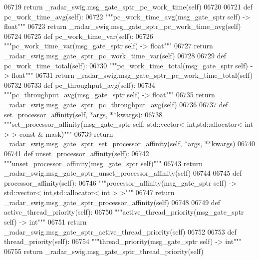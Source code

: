 \begin{DoxyCode}
{{{{{{{{{{{{{{{{{{{{{{06719         \textcolor{keywordflow}{return} \_radar\_swig.msg\_gate\_sptr\_pc\_work\_time(self)
06720 
06721     \textcolor{keyword}{def }pc_work_time_avg(self):
06722         \textcolor{stringliteral}{"""pc\_work\_time\_avg(msg\_gate\_sptr self) -> float"""}
06723         \textcolor{keywordflow}{return} \_radar\_swig.msg\_gate\_sptr\_pc\_work\_time\_avg(self)
06724 
06725     \textcolor{keyword}{def }pc_work_time_var(self):
06726         \textcolor{stringliteral}{"""pc\_work\_time\_var(msg\_gate\_sptr self) -> float"""}
06727         \textcolor{keywordflow}{return} \_radar\_swig.msg\_gate\_sptr\_pc\_work\_time\_var(self)
06728 
06729     \textcolor{keyword}{def }pc_work_time_total(self):
06730         \textcolor{stringliteral}{"""pc\_work\_time\_total(msg\_gate\_sptr self) -> float"""}
06731         \textcolor{keywordflow}{return} \_radar\_swig.msg\_gate\_sptr\_pc\_work\_time\_total(self)
06732 
06733     \textcolor{keyword}{def }pc_throughput_avg(self):
06734         \textcolor{stringliteral}{"""pc\_throughput\_avg(msg\_gate\_sptr self) -> float"""}
06735         \textcolor{keywordflow}{return} \_radar\_swig.msg\_gate\_sptr\_pc\_throughput\_avg(self)
06736 
06737     \textcolor{keyword}{def }set_processor_affinity(self, *args, **kwargs):
06738         \textcolor{stringliteral}{"""set\_processor\_affinity(msg\_gate\_sptr self, std::vector< int,std::allocator< int > > const &
       mask)"""}
06739         \textcolor{keywordflow}{return} \_radar\_swig.msg\_gate\_sptr\_set\_processor\_affinity(self, *args, **kwargs)
06740 
06741     \textcolor{keyword}{def }unset_processor_affinity(self):
06742         \textcolor{stringliteral}{"""unset\_processor\_affinity(msg\_gate\_sptr self)"""}
06743         \textcolor{keywordflow}{return} \_radar\_swig.msg\_gate\_sptr\_unset\_processor\_affinity(self)
06744 
06745     \textcolor{keyword}{def }processor_affinity(self):
06746         \textcolor{stringliteral}{"""processor\_affinity(msg\_gate\_sptr self) -> std::vector< int,std::allocator< int > >"""}
06747         \textcolor{keywordflow}{return} \_radar\_swig.msg\_gate\_sptr\_processor\_affinity(self)
06748 
06749     \textcolor{keyword}{def }active_thread_priority(self):
06750         \textcolor{stringliteral}{"""active\_thread\_priority(msg\_gate\_sptr self) -> int"""}
06751         \textcolor{keywordflow}{return} \_radar\_swig.msg\_gate\_sptr\_active\_thread\_priority(self)
06752 
06753     \textcolor{keyword}{def }thread_priority(self):
06754         \textcolor{stringliteral}{"""thread\_priority(msg\_gate\_sptr self) -> int"""}
06755         \textcolor{keywordflow}{return} \_radar\_swig.msg\_gate\_sptr\_thread\_priority(self)
}}}}}}}}}}}}}}}}}}}}}}
\end{DoxyCode}
